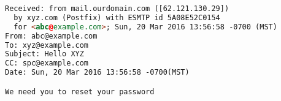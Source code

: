 \begin{lstlisting}[language=HTML,caption={SMTP headers generated by a PHP mail
  script.},label={code:smtpheaders}, float]
Received: from mail.ourdomain.com ([62.121.130.29])
  by xyz.com (Postfix) with ESMTP id 5A08E52C0154
  for <abc@example.com>; Sun, 20 Mar 2016 13:56:58 -0700 (MST)
From: abc@example.com
To: xyz@example.com
Subject: Hello XYZ
CC: spc@example.com
Date: Sun, 20 Mar 2016 13:56:58 -0700(MST)

We need you to reset your password
\end{lstlisting}
